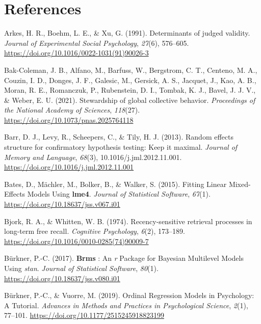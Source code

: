 \documentclass[10pt, letterpaper]{article}
\newenvironment{CSLReferences}%
  {}%
  {\par}
\begin{document}
\hypertarget{references}{%
\section{References}\label{references}}

\setlength{\parindent}{-0.1in} 
\setlength{\leftskip}{0.125in}

\noindent

\hypertarget{refs}{}
\begin{CSLReferences}
\leavevmode\hypertarget{ref-arkes.etal1991}{}%
Arkes, H. R., Boehm, L. E., \& Xu, G. (1991). Determinants of judged
validity. \emph{Journal of Experimental Social Psychology},
\emph{27}(6), 576--605.
\url{https://doi.org/10.1016/0022-1031(91)90026-3}

\leavevmode\hypertarget{ref-bak-coleman.etal2021}{}%
Bak-Coleman, J. B., Alfano, M., Barfuss, W., Bergstrom, C. T., Centeno,
M. A., Couzin, I. D., Donges, J. F., Galesic, M., Gersick, A. S.,
Jacquet, J., Kao, A. B., Moran, R. E., Romanczuk, P., Rubenstein, D. I.,
Tombak, K. J., Bavel, J. J. V., \& Weber, E. U. (2021). Stewardship of
global collective behavior. \emph{Proceedings of the National Academy of
Sciences}, \emph{118}(27). \url{https://doi.org/10.1073/pnas.2025764118}

\leavevmode\hypertarget{ref-barr.etal2013}{}%
Barr, D. J., Levy, R., Scheepers, C., \& Tily, H. J. (2013). Random
effects structure for confirmatory hypothesis testing: {Keep} it
maximal. \emph{Journal of Memory and Language}, \emph{68}(3),
10.1016/j.jml.2012.11.001.
\url{https://doi.org/10.1016/j.jml.2012.11.001}

\leavevmode\hypertarget{ref-bates.etal2015}{}%
Bates, D., Mächler, M., Bolker, B., \& Walker, S. (2015). Fitting
{Linear} {Mixed}-{Effects} {Models} {Using} \textbf{lme4}. \emph{Journal
of Statistical Software}, \emph{67}(1).
\url{https://doi.org/10.18637/jss.v067.i01}

\leavevmode\hypertarget{ref-bjork.whitten1974}{}%
Bjork, R. A., \& Whitten, W. B. (1974). Recency-sensitive retrieval
processes in long-term free recall. \emph{Cognitive Psychology},
\emph{6}(2), 173--189.
\url{https://doi.org/10.1016/0010-0285(74)90009-7}

\leavevmode\hypertarget{ref-burkner2017}{}%
Bürkner, P.-C. (2017). \textbf{Brms} : {An} \emph{r} {Package} for
{Bayesian} {Multilevel} {Models} {Using} \emph{stan}. \emph{Journal of
Statistical Software}, \emph{80}(1).
\url{https://doi.org/10.18637/jss.v080.i01}

\leavevmode\hypertarget{ref-burkner.vuorre2019}{}%
Bürkner, P.-C., \& Vuorre, M. (2019). Ordinal {Regression} {Models} in
{Psychology}: {A} {Tutorial}. \emph{Advances in Methods and Practices in
Psychological Science}, \emph{2}(1), 77--101.
\url{https://doi.org/10.1177/2515245918823199}


\end{CSLReferences}
\end{document}
